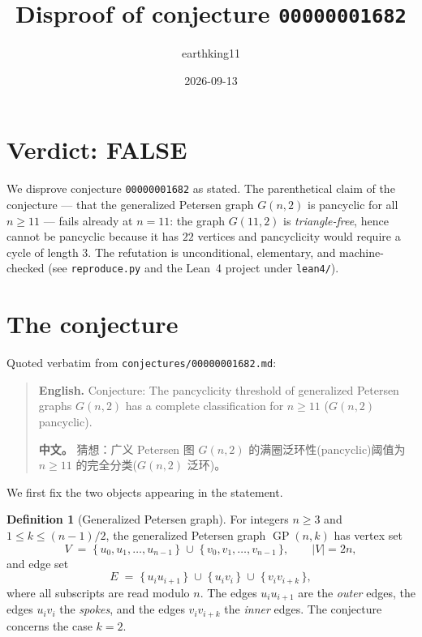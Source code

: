 \documentclass[11pt]{article}
\title{Disproof of conjecture \texttt{00000001682}}
\author{earthking11}
\date{2026-09-13}
\theoremstyle{definition}
\newtheorem{definition}[theorem]{Definition}
\theoremstyle{remark}
\newcommand{\GP}{\operatorname{GP}}
\begin{document}
\maketitle

\section*{Verdict: FALSE}

We disprove conjecture \texttt{00000001682} as stated. The parenthetical claim of
the conjecture --- that the generalized Petersen graph $G(n,2)$ is pancyclic for
all $n \ge 11$ --- fails already at $n = 11$: the graph $G(11,2)$ is
\emph{triangle-free}, hence cannot be pancyclic because it has $22$ vertices and
pancyclicity would require a cycle of length $3$. The refutation is
unconditional, elementary, and machine-checked (see
\texttt{reproduce.py} and the Lean~4 project under \texttt{lean4/}).

\section{The conjecture}

Quoted verbatim from \texttt{conjectures/00000001682.md}:

\begin{quote}
\textbf{English.} Conjecture: The pancyclicity threshold of generalized Petersen
graphs $G(n, 2)$ has a complete classification for $n \ge 11$ ($G(n,2)$
pancyclic).

\textbf{中文。} 猜想：广义 Petersen 图 $G(n, 2)$ 的满圈泛环性(pancyclic)阈值为
$n \ge 11$ 的完全分类($G(n,2)$ 泛环)。
\end{quote}

We first fix the two objects appearing in the statement.

\begin{definition}[Generalized Petersen graph]\label{def:gp}
For integers $n \ge 3$ and $1 \le k \le (n-1)/2$, the generalized Petersen graph
$\GP(n,k)$ has vertex set
\[
V \;=\; \{\,u_0, u_1, \dots, u_{n-1}\,\} \;\cup\; \{\,v_0, v_1, \dots, v_{n-1}\,\},
\qquad |V| = 2n,
\]
and edge set
\[
E \;=\; \{\,u_i u_{i+1}\,\} \;\cup\; \{\,u_i v_i\,\} \;\cup\; \{\,v_i v_{i+k}\,\},
\]
where all subscripts are read modulo $n$. The edges $u_i u_{i+1}$ are the
\emph{outer} edges, the edges $u_i v_i$ the \emph{spokes}, and the edges
$v_i v_{i+k}$ the \emph{inner} edges. The conjecture concerns the case $k = 2$.
\end{definition}
\end{document}
